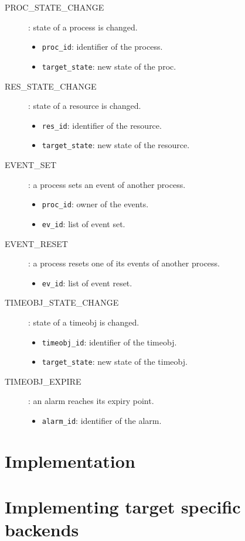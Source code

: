 \begin{description}
  \item[PROC\_STATE\_CHANGE]: state of a process is changed.
    \begin{itemize}
      \item \texttt{proc_id}: identifier of the process.
      \item \texttt{target_state}: new state of the proc. %
    \end{itemize}

  \item[RES\_STATE\_CHANGE]: state of a resource is changed.
    \begin{itemize}
      \item \texttt{res_id}: identifier of the resource.
      \item \texttt{target_state}: new state of the resource.
    \end{itemize}

  \item[EVENT_SET]: a process sets an event of another process.
    \begin{itemize}
      \item \texttt{proc_id}: owner of the events.
      \item \texttt{ev_id}: list of event set.
    \end{itemize}

  \item[EVENT_RESET]: a process resets one of its events of another process.
    \begin{itemize}
      \item \texttt{ev_id}: list of event reset.
    \end{itemize}

  \item[TIMEOBJ_STATE_CHANGE]: state of a timeobj is changed.
    \begin{itemize}
      \item \texttt{timeobj_id}: identifier of the timeobj.
      \item \texttt{target_state}: new state of the timeobj.
    \end{itemize}

  \item[TIMEOBJ_EXPIRE]: an alarm reaches its expiry point.
    \begin{itemize}
      \item \texttt{alarm_id}: identifier of the alarm.
    \end{itemize}

\end{description}

\section{Implementation}

\section{Implementing target specific backends}
\label{sec:trace:targetbackend}
